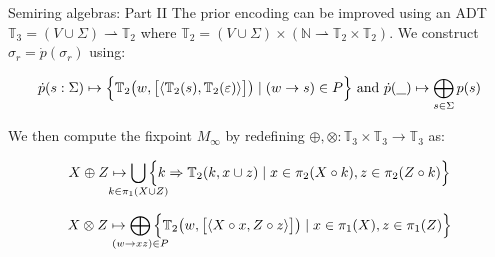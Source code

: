 \documentclass{beamer}
\newcommand\hole{\underline{\hspace{0.25cm}}}
\begin{document}
\begin{frame}[fragile]{Semiring algebras: Part II}
  The prior encoding can be improved using an ADT $\mathbb{T}_3 = (V \cup \Sigma) \rightharpoonup \mathbb{T}_2$ where $\mathbb{T}_2 = (V \cup \Sigma) \times (\mathbb{N} \rightharpoonup \mathbb{T}_2\times\mathbb{T}_2)$. We construct $\hat\sigma_r = \dot{p}(\sigma_r)$ using:

  \begin{equation*}
    \dot{p}(s: \Sigma) \mapsto \Big\{\mathbb{T}_2\big(w, \big[\langle\mathbb{T}_2(s), \mathbb{T}_2(\varepsilon)\rangle\big]\big) \mid (w \rightarrow s)\in P\Big\} \text{ and } \dot{p}(\hole) \mapsto \bigoplus_{s\in \Sigma} p(s)
  \end{equation*}

  \noindent We then compute the fixpoint $M_\infty$ by redefining $\oplus, \otimes: \mathbb{T}_3 \times \mathbb{T}_3 \rightarrow \mathbb{T}_3$ as:

  \begin{equation*}
    X \oplus Z \mapsto \bigcup_{\mathclap{k\in \pi_1(X \cup Z)}}\Big\{k \Rightarrow \mathbb{T}_2(k, x \cup z) \mid x \in \pi_2(X\circ k), z \in \pi_2(Z\circ k)\Big\}
  \end{equation*}

  \begin{equation*}
    X \otimes Z \mapsto \bigoplus_{\mathclap{(w\rightarrow xz) \in P}}\Big\{\mathbb{T}_2\big(w, \big[\langle X\circ x, Z\circ z\rangle\big]\big) \mid x \in \pi_1(X), z \in \pi_1(Z)\Big\}
  \end{equation*}
\end{frame}
\end{document}

